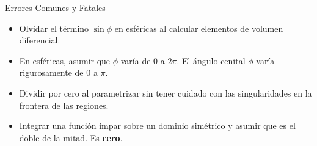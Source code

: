 \documentclass[11pt,a4paper]{article}
\begin{document}
\begin{errorbox}{Errores Comunes y Fatales}
\begin{itemize}
    \item Olvidar el término $\sin \phi$ en esféricas al calcular elementos de volumen diferencial.
    \item En esféricas, asumir que $\phi$ varía de $0$ a $2\pi$. El ángulo cenital $\phi$ varía rigurosamente de $0$ a $\pi$.
    \item Dividir por cero al parametrizar sin tener cuidado con las singularidades en la frontera de las regiones.
    \item Integrar una función impar sobre un dominio simétrico y asumir que es el doble de la mitad. Es \textbf{cero}.
\end{itemize}
\end{errorbox}
\end{document}
